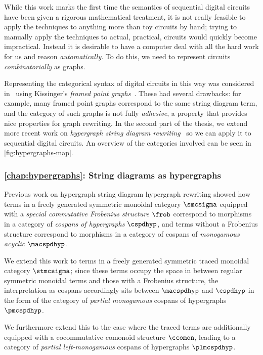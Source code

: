 While this work marks the first time the semantics of sequential digital
circuits have been given a rigorous mathematical treatment, it is not really
feasible to apply the techniques to anything more than toy circuits by hand;
trying to manually apply the techniques to actual, practical, circuits would
quickly become impractical.
Instead it is desirable to have a computer deal with all the hard work
for us and reason \emph{automatically}.
To do this, we need to represent circuits \emph{combinatorially} as graphs.

Representing the categorical syntax of digital circuits in this way was
considered in~\cite{ghica2017diagrammatic} using
Kissinger's \emph{framed point graphs}~\cite{kissinger2012pictures}.
These had several drawbacks: for example, many framed point graphs correspond to
the same string diagram term, and the category of such graphs is not fully
\emph{adhesive}, a property that provides nice properties for graph rewriting.
In the second part of the thesis, we extend more recent work on
\emph{hypergraph string diagram rewriting}~\cite{bonchi2022string,bonchi2022stringa,bonchi2022stringb}
so we can apply it to sequential digital circuits.
An overview of the categories involved can be seen in
\cref{fig:hypergraphs-map}.

\subsubsection{\cref{chap:hypergraphs}: String diagrams as hypergraphs}

Previous work on hypergraph string diagram hypergraph rewriting showed how terms
in a freely generated symmetric monoidal category \(\smcsigma\) equipped with a
\emph{special commutative Frobenius structure} \(\frob\) correspond to morphisms
in a category of \emph{cospans of hypergraphs} \(\cspdhyp\), and terms without a
Frobenius structure correspond to morphisms in a category of
cospans of \emph{monogamous acyclic} \(\macspdhyp\).

We extend this work to terms in a freely generated symmetric traced monoidal
category \(\stmcsigma\); since these terms occupy the space in between regular
symmetric monoidal terms and those with a Frobenius structure, the
interpretation as cospans accordingly sits between \(\macspdhyp\) and
\(\cspdhyp\) in the form of the category of \emph{partial monogamous} cospans of
hypergraphs \(\pmcspdhyp\).

We furthermore extend this to the case where the traced terms are additionally
equipped with a cocommutative comonoid structure \(\ccomon\), leading to a
category of \emph{partial left-monogamous} cospans of hypergraphs
\(\plmcspdhyp\).

